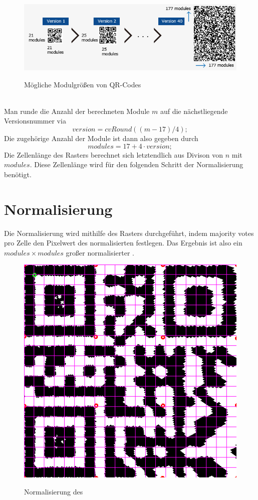 \begin{figure}[h]
\centering
\includegraphics[scale=0.5]{images/QRVersion.png}
\label{fig:version-qrcode}\caption{Mögliche Modulgrößen von QR-Codes} 
\end{figure}
\\
Man runde die Anzahl der berechneten Module $m$ auf die nächstliegende Versionsnummer via
\begin{equation*}
	version = cvRound((m-17)/4);
\end{equation*}
Die zugehörige Anzahl der Module ist dann also gegeben durch
\begin{equation*}
	modules = 17+4 \cdot version;
\end{equation*} 
Die Zellenlänge des Rasters berechnet sich letztendlich aus Divison von $n$ mit $modules$. Diese Zellenlänge wird für den folgenden Schritt der Normalisierung benötigt.

\section{Normalisierung}
Die Normalisierung wird mithilfe des Rasters durchgeführt, indem majority votes pro Zelle den Pixelwert des normalisierten \QRCodes festlegen.
Das Ergebnis ist also ein $modules \times modules$ großer normalisierter \QRCode.
\begin{figure}[h]
\centering
\includegraphics[scale=0.25]{images/gitter.png}
\label{fig:version-qrcode}\caption{Normalisierung des \QRCodes}
\end{figure}

